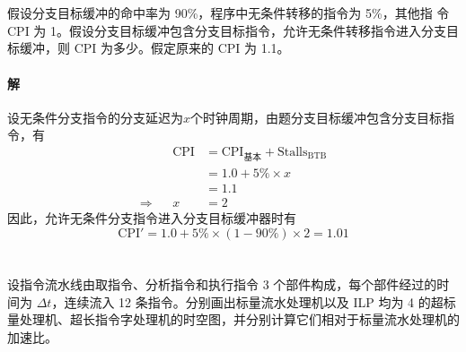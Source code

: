 \documentclass{article}
\begin{document}
\section{}
假设分支目标缓冲的命中率为 90\%，程序中无条件转移的指令为 5\%，其他指
令 CPI 为 1。假设分支目标缓冲包含分支目标指令，允许无条件转移指令进入分支目标缓冲，则 CPI 为多少。假定原来的 CPI 为 1.1。

\paragraph{解}
设无条件分支指令的分支延迟为$x$个时钟周期，由题分支目标缓冲包含分支目标指令，有
\begin{align*}
                &  & \text{CPI} & = \text{CPI}_{\text{基本}} + \text{Stalls}_{\text{BTB}} \\
                &  &            & = 1.0 + 5\% \times x                                    \\
                &  &            & = 1.1                                                   \\
    \Rightarrow &  & x          & = 2
\end{align*}
因此，允许无条件分支指令进入分支目标缓冲器时有
\begin{equation*}
    \text{CPI}' = 1.0 + 5\% \times (1 - 90\%) \times 2 = 1.01
\end{equation*}

\section{}
设指令流水线由取指令、分析指令和执行指令 3 个部件构成，每个部件经过的时间为 $\Delta t$，连续流入 12 条指令。分别画出标量流水处理机以及 ILP 均为 4 的超标量处理机、超长指令字处理机的时空图，并分别计算它们相对于标量流水处理机的加速比。
\end{document}
